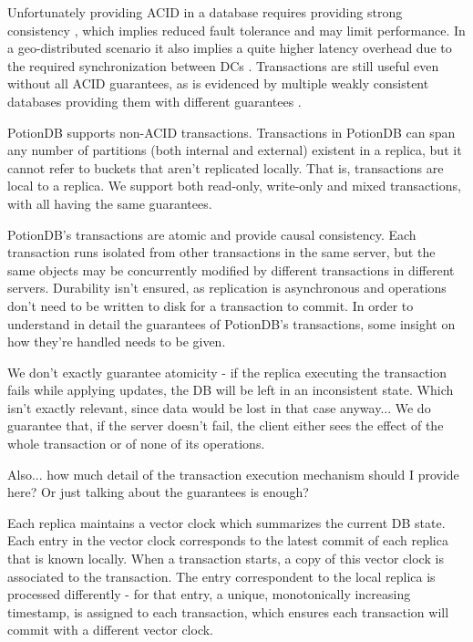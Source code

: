 \documentclass{vldb}
\newcommand{\grumbler}[2]{{\color{red}{\bf #1:} #2}}
\newcommand{\andre}[1]{\grumbler{andre}{#1}}
\begin{document}
Unfortunately providing ACID in a database requires providing strong consistency \cite{???}
, which implies reduced fault tolerance and may limit performance.
In a geo-distributed scenario it also implies a quite higher latency overhead due to the required synchronization between DCs \cite{???}.
Transactions are still useful even without all ACID guarantees, as is evidenced by multiple weakly consistent databases providing them with different guarantees \cite{???}.

PotionDB supports non-ACID transactions.
Transactions in PotionDB can span any number of partitions (both internal and external) existent in a replica, but it cannot refer to buckets that aren't replicated locally.
That is, transactions are local to a replica.
We support both read-only, write-only and mixed transactions, with all having the same guarantees.

PotionDB's transactions are atomic and provide causal consistency.
Each transaction runs isolated from other transactions in the same server, but the same objects may be concurrently modified by different transactions in different servers.
Durability isn't ensured, as replication is asynchronous and operations don't need to be written to disk for a transaction to commit.
In order to understand in detail the guarantees of PotionDB's transactions, some insight on how they're handled needs to be given.

\andre{We don't exactly guarantee atomicity - if the replica executing the transaction fails while applying updates, the DB will be left in an inconsistent state. Which isn't exactly relevant, since data would be lost in that case anyway... We do guarantee that, if the server doesn't fail, the client either sees the effect of the whole transaction or of none of its operations.}

\andre{Also... how much detail of the transaction execution mechanism should I provide here? Or just talking about the guarantees is enough?}

Each replica maintains a vector clock which summarizes the current DB state.
Each entry in the vector clock corresponds to the latest commit of each replica that is known locally.
When a transaction starts, a copy of this vector clock is associated to the transaction.
The entry correspondent to the local replica is processed differently - for that entry, a unique, monotonically increasing timestamp, is assigned to each transaction, which ensures each transaction will commit with a different vector clock.
\end{document}
